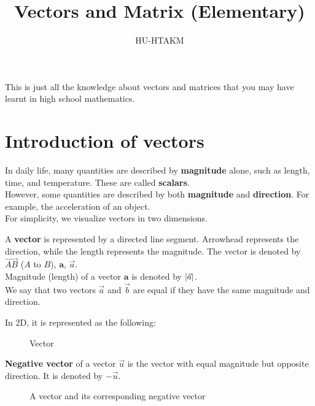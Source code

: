 \documentclass{huhtakm-template-book}
\title{Vectors and Matrix (Elementary)}
\author{HU-HTAKM}
\begin{document}
\maketitle
This is just all the knowledge about vectors and matrices that you may have learnt in high school mathematics.
\tableofcontents
\chapter{Introduction of vectors}
In daily life, many quantities are described by \textbf{magnitude} alone, such as length, time, and temperature. These are called \textbf{scalars}.\\
However, some quantities are described by both \textbf{magnitude} and \textbf{direction}. For example, the acceleration of an object.\\
For simplicity, we visualize vectors in two dimensions.
\begin{defn}
    A \textbf{vector} is represented by a directed line segment. Arrowhead represents the direction, while the length represents the magnitude. The vector is denoted by $\overrightarrow{AB}$ ($A$ to $B$), $\mathbf{a}$, $\vec{a}$.\\
    Magnitude (length) of a vector $\mathbf{a}$ is denoted by $\left|{\vec{a}}\right|$.\\
    We say that two vectors $\vec{a}$ and $\vec{b}$ are equal if they have the same magnitude and direction.
\end{defn}
In 2D, it is represented as the following:
\begin{figure}[h]
    \centering
    \caption{Vector}
    \label{fig:vector}
\end{figure}
\begin{defn}
    \textbf{Negative vector} of a vector $\vec{u}$ is the vector with equal magnitude but opposite direction. It is denoted by $-\vec{u}$.
\end{defn}
\begin{figure}[h]
    \centering
    \caption{A vector and its corresponding negative vector}
    \label{fig:negative vector}
\end{figure}
\end{document}
